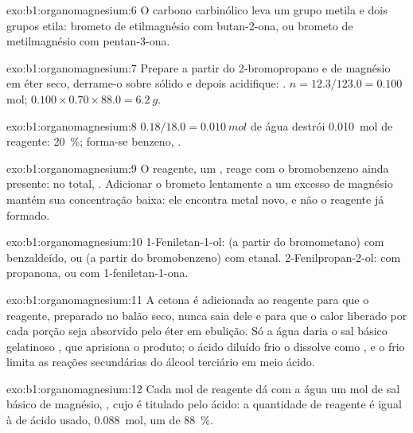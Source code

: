 \begin{solution}{exo:b1:organomagnesium:6}
O carbono carbinólico leva um grupo metila e dois grupos etila: brometo
de etilmagnésio com butan-2-ona, ou brometo de metilmagnésio com
pentan-3-ona.
\end{solution}

\begin{solution}{exo:b1:organomagnesium:7}
Prepare  a partir do 2-bromopropano e de magnésio em
éter seco, derrame-o sobre  sólido e depois acidifique:
. $n = 12.3/123.0 = 0.100$ mol;
$0.100 \times 0.70 \times 88.0 = \qty{6.2}{g}$.
\end{solution}

\begin{solution}{exo:b1:organomagnesium:8}
$0.18/18.0 = \qty{0.010}{mol}$ de água destrói \qty{0.010}{mol} de
reagente: \qty{20}{\percent}; forma-se benzeno, .
\end{solution}

\begin{solution}{exo:b1:organomagnesium:9}
O reagente, um , reage com o bromobenzeno ainda presente: no
total, . Adicionar o brometo
lentamente a um excesso de magnésio mantém sua concentração baixa: ele
encontra metal novo, e não o reagente já formado.
\end{solution}

\begin{solution}{exo:b1:organomagnesium:10}
1-Feniletan-1-ol:  (a partir do bromometano) com benzaldeído,
ou  (a partir do bromobenzeno) com etanal.
2-Fenilpropan-2-ol:  com propanona, ou  com
1-feniletan-1-ona.
\end{solution}

\begin{solution}{exo:b1:organomagnesium:11}
A cetona é adicionada ao reagente para que o reagente, preparado no
balão seco, nunca saia dele e para que o calor liberado por cada porção
seja absorvido pelo éter em ebulição. Só a água daria o sal básico
gelatinoso , que aprisiona o produto; o ácido diluído frio
o dissolve como , e o frio limita as reações secundárias do
álcool terciário em meio ácido.
\end{solution}

\begin{solution}{exo:b1:organomagnesium:12}
Cada mol de reagente dá com a água um mol de sal básico de magnésio,
, cujo  é titulado pelo ácido:
a quantidade de reagente é igual à de ácido usado, \qty{0.088}{mol}, um
 de
\qty{88}{\percent}.
\end{solution}

